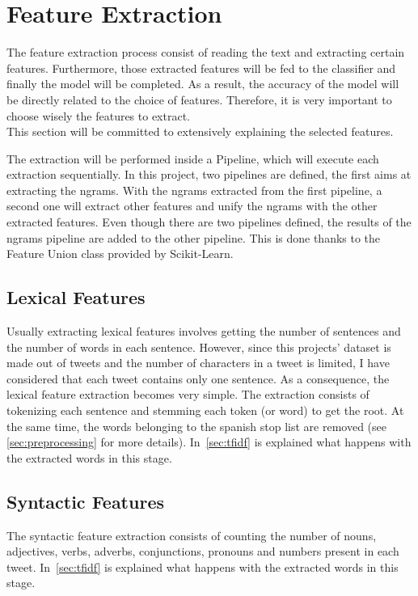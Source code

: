 \section{Feature Extraction}
 The feature extraction process consist of reading the text and extracting certain features. Furthermore, those extracted features will be fed to the classifier and finally the model will be completed. As a result, the accuracy of the model will be directly related to the choice of features. Therefore, it is very important to choose wisely the features to extract.\\
This section will be committed to extensively explaining the selected features.
\par
The extraction will be performed inside a Pipeline, which will execute each extraction sequentially. In this project, two pipelines are defined, the first aims at extracting the ngrams. With the ngrams extracted from the first pipeline, a second one will extract other features and unify the ngrams with the other extracted features. Even though there are two pipelines defined, the results of the ngrams pipeline are added to the other pipeline. This is done thanks to the Feature Union class provided by Scikit-Learn.
\subsection{Lexical Features}
Usually extracting lexical features involves getting the number of sentences and the number of words in each sentence. However, since this projects' dataset is made out of tweets and the number of characters in a tweet is limited, I have considered that each tweet contains only one sentence. As a consequence, the lexical feature extraction becomes very simple. The extraction consists of tokenizing each sentence and stemming each token (or word) to get the root. At the same time, the words belonging to the spanish stop list are removed (see \cref{sec:preprocessing} for more details). In~\cref{sec:tfidf} is explained what happens with the extracted words in this stage.
\subsection{Syntactic Features}
The syntactic feature extraction consists of counting the number of nouns, adjectives, verbs, adverbs, conjunctions, pronouns and numbers present in each tweet. In~\cref{sec:tfidf} is explained what happens with the extracted words in this stage.
